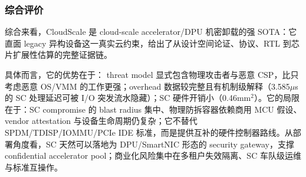 \documentclass[11pt]{ctexart}
\begin{document}
\subsubsection{综合评价}
综合来看，CloudScale 是 cloud-scale accelerator/DPU 机密卸载的强 SOTA：它直面 legacy 异构设备这一真实云约束，给出了从设计空间论证、协议、RTL 到芯片扩展性估算的完整证据链。\par
具体而言，它的优势在于： threat model 显式包含物理攻击者与恶意 CSP，比只考虑恶意 OS/VMM 的工作更强；overhead 数据较完整且有机制级解释（3.585$\mu$s 的 SC 处理延迟可被 I/O 突发流水隐藏）；SC 硬件开销小（0.46mm$^2$）。它的局限在于：SC compromise 的 blast radius 集中、物理防拆容器依赖商用 MCU 假设、vendor attestation 与设备生命周期仍复杂；它不替代 SPDM/TDISP/IOMMU/PCIe IDE 标准，而是提供互补的硬件控制器路线。从部署角度看，SC 天然可以落地为 DPU/SmartNIC 形态的 security gateway，支撑 confidential accelerator pool；商业化风险集中在多租户失效隔离、SC 车队级运维与标准互操作。\par
\end{document}
